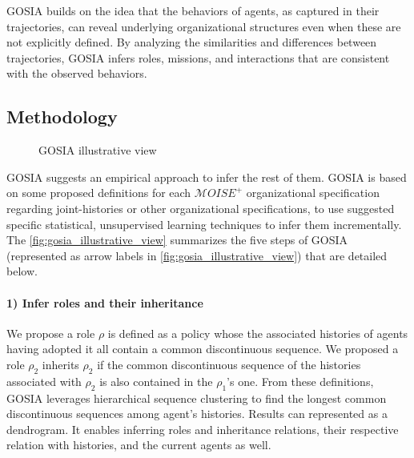 \documentclass[sn-mathphys-num]{sn-jnl}%
\theoremstyle{thmstyleone}%
\theoremstyle{thmstyletwo}%
\theoremstyle{thmstylethree}%
\begin{document}
GOSIA builds on the idea that the behaviors of agents, as captured in their trajectories, can reveal underlying organizational structures even when these are not explicitly defined. By analyzing the similarities and differences between trajectories, GOSIA infers roles, missions, and interactions that are consistent with the observed behaviors.

\subsection{Methodology}


\begin{figure*}[h!]
    \centering
    
    \caption{GOSIA illustrative view}
    \label{fig:gosia_illustrative_view}
\end{figure*}

GOSIA suggests an empirical approach to infer the rest of them.
GOSIA is based on some proposed definitions for each $\mathcal{M}OISE^+$ organizational specification regarding joint-histories or other organizational specifications, to use suggested specific statistical, unsupervised learning techniques to infer them incrementally. The \autoref{fig:gosia_illustrative_view} summarizes the five steps of GOSIA (represented as arrow labels in \autoref{fig:gosia_illustrative_view}) that are detailed below.
%
\paragraph{1) Infer roles and their inheritance}

We propose a role $\rho$ is defined as a policy whose the associated histories of agents having adopted it all contain a common discontinuous sequence. We proposed a role $\rho_2$ inherits $\rho_2$ if the common discontinuous sequence of the histories associated with $\rho_2$ is also contained in the $\rho_1$'s one.
From these definitions, GOSIA leverages hierarchical sequence clustering to find the longest common discontinuous sequences among agent's histories. Results can represented as a dendrogram. It enables inferring roles and inheritance relations, their respective relation with histories, and the current agents as well.
\end{document}
